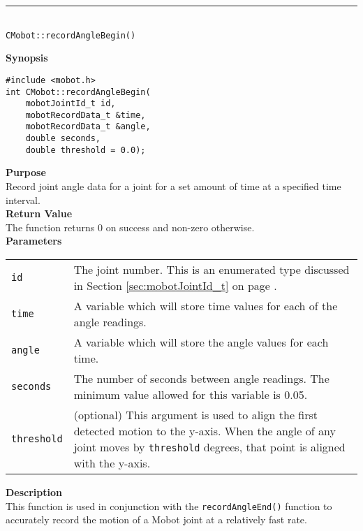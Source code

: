 \noindent
\vspace{5pt}
\rule{4.5in}{0.015in}\\
\noindent
{\LARGE \texttt{CMobot::recordAngleBegin()}}\\
{}

\noindent
{\bf Synopsis}
\vspace{-8pt}
\begin{verbatim}
#include <mobot.h>
int CMobot::recordAngleBegin(
    mobotJointId_t id, 
    mobotRecordData_t &time, 
    mobotRecordData_t &angle, 
    double seconds, 
    double threshold = 0.0);
\end{verbatim}

\noindent
{\bf Purpose}\\
Record joint angle data for a joint for a set amount of time at a specified time interval.\\

\noindent
{\bf Return Value}\\
The function returns 0 on success and non-zero otherwise.\\

\noindent
{\bf Parameters}\\
\vspace{-0.1in}
\begin{description}
\item               
\begin{tabular}{p{15 mm}p{145 mm}}
\texttt{id} & The joint number. This is an enumerated type 
discussed in Section \ref{sec:mobotJointId_t} on page
\pageref{sec:mobotJointId_t}.\\
\texttt{time} & A variable which will store time values for each of the angle readings. \\
\texttt{angle} & A variable which will store the angle values for each time. \\
\texttt{seconds} & The number of seconds between angle readings. The minimum value allowed for
this variable is 0.05. \\
\texttt{threshold} & (optional) This argument is used to align the first
detected motion to the y-axis. When the angle of any joint moves by
\texttt{threshold} degrees, that point is aligned with the y-axis.
\end{tabular}
\end{description}

\noindent
{\bf Description}\\
This function is used in conjunction with the \texttt{recordAngleEnd()}
function to accurately record the motion of a Mobot joint at a relatively fast
rate. 

